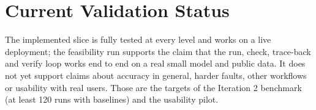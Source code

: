 \section{Current Validation Status}

The implemented slice is fully tested at every level and works on a live deployment; the feasibility run supports the claim that the run, check, trace-back and verify loop works end to end on a real small model and public data. It does not yet support claims about accuracy in general, harder faults, other workflows or usability with real users. Those are the targets of the Iteration 2 benchmark (at least 120 runs with baselines) and the usability pilot.
